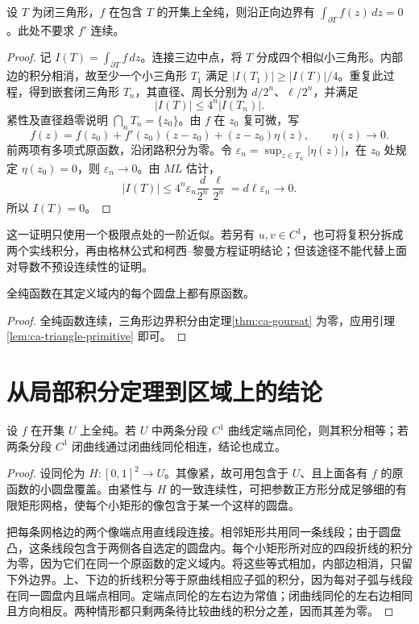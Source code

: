 \documentclass[UTF8,12pt,a4paper,fontset=fandol]{ctexbook}
\begin{document}
\begin{theorem}
\label{thm:ca-goursat}
设 $T$ 为闭三角形，$f$ 在包含 $T$ 的开集上全纯，则沿正向边界有 $\int_{\partial T}f(z)\,dz=0$。此处不要求 $f'$ 连续。
\end{theorem}
\begin{proof}
记 $I(T)=\int_{\partial T}f\,dz$。连接三边中点，将 $T$ 分成四个相似小三角形。内部边的积分相消，故至少一个小三角形 $T_1$ 满足 $|I(T_1)|\ge|I(T)|/4$。重复此过程，得到嵌套闭三角形 $T_n$，其直径、周长分别为 $d/2^n$、$\ell/2^n$，并满足
\[
 |I(T)|\le4^n|I(T_n)|.
\]
紧性及直径趋零说明 $\bigcap_nT_n=\{z_0\}$。由 $f$ 在 $z_0$ 复可微，写
\[
 f(z)=f(z_0)+f'(z_0)(z-z_0)+(z-z_0)\eta(z),\qquad \eta(z)\to0.
\]
前两项有多项式原函数，沿闭路积分为零。令 $\varepsilon_n=\sup_{z\in T_n}|\eta(z)|$，在 $z_0$ 处规定 $\eta(z_0)=0$，则 $\varepsilon_n\to0$。由 $ML$ 估计，
\[
 |I(T)|\le4^n\varepsilon_n\frac d{2^n}\frac\ell{2^n}
 =d\ell\varepsilon_n\longrightarrow0.
\]
所以 $I(T)=0$。
\end{proof}

这一证明只使用一个极限点处的一阶近似。若另有 $u,v\in C^1$，也可将复积分拆成两个实线积分，再由格林公式和柯西--黎曼方程证明结论；但该途径不能代替上面对导数不预设连续性的证明。

\begin{corollary}[局部原函数]
\label{cor:ca-local-primitive}
全纯函数在其定义域内的每个圆盘上都有原函数。
\end{corollary}
\begin{proof}
全纯函数连续，三角形边界积分由定理\ref{thm:ca-goursat} 为零，应用引理\ref{lem:ca-triangle-primitive} 即可。
\end{proof}

\section{从局部积分定理到区域上的结论}

\begin{theorem}[积分的同伦不变性]
\label{thm:ca-homotopy}
设 $f$ 在开集 $U$ 上全纯。若 $U$ 中两条分段 $C^1$ 曲线定端点同伦，则其积分相等；若两条分段 $C^1$ 闭曲线通过闭曲线同伦相连，结论也成立。
\end{theorem}
\begin{proof}
设同伦为 $H:[0,1]^2\to U$。其像紧，故可用包含于 $U$、且上面各有 $f$ 的原函数的小圆盘覆盖。由紧性与 $H$ 的一致连续性，可把参数正方形分成足够细的有限矩形网格，使每个小矩形的像包含于某一个这样的圆盘。

把每条网格边的两个像端点用直线段连接。相邻矩形共用同一条线段；由于圆盘凸，这条线段包含于两侧各自选定的圆盘内。每个小矩形所对应的四段折线的积分为零，因为它们在同一个原函数的定义域内。将这些等式相加，内部边相消，只留下外边界。上、下边的折线积分等于原曲线相应子弧的积分，因为每对子弧与线段在同一圆盘内且端点相同。定端点同伦的左右边为常值；闭曲线同伦的左右边相同且方向相反。两种情形都只剩两条待比较曲线的积分之差，因而其差为零。
\end{proof}
\end{document}
